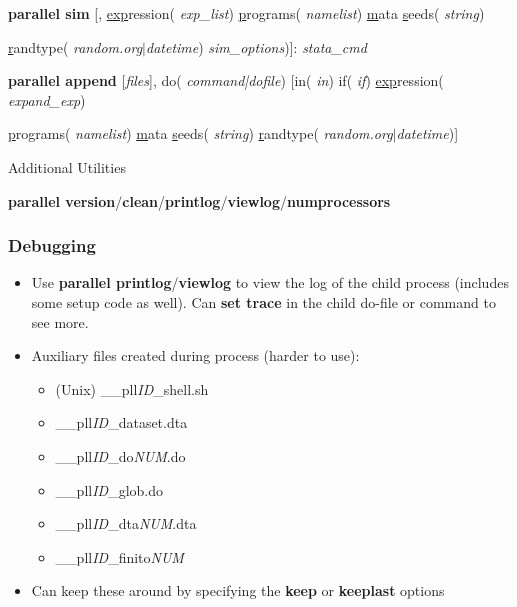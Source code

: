 \documentclass[9pt,\ExtraDocOpts]{beamer}
\begin{document}
\begin{frame}
\begin{semiverbatim}
	\footnotesize
	{\bf parallel sim} [, \uline{exp}ression(\textit{\color{blue} exp\_list}) \uline{p}rograms(\textit{\color{blue} namelist}) \uline{m}ata \uline{s}eeds(\textit{\color{blue} string})
	
	\hspace{1cm} \uline{r}andtype(\textit{\color{blue} random.org$|$datetime}) \textit{sim\_options})]:  \textit{stata\_cmd}
\end{semiverbatim}\pause{}

\begin{semiverbatim}
	\footnotesize
	{\bf parallel append} [\textit{files}], do(\textit{\color{blue} command|dofile}) [in(\textit{\color{blue} in}) if(\textit{\color{blue} if}) \uline{exp}ression(\textit{\color{blue} expand\_exp})
	
	\hspace{1cm} \uline{p}rograms(\textit{\color{blue} namelist}) \uline{m}ata \uline{s}eeds(\textit{\color{blue} string}) \uline{r}andtype(\textit{\color{blue} random.org$|$datetime})]
\end{semiverbatim}\pause{}

Additional Utilities
\begin{semiverbatim}
	\footnotesize
	{\bf parallel version}/{\bf clean}/{\bf printlog}/{\bf viewlog}/{\bf numprocessors}
\end{semiverbatim}

\end{frame}

\begin{frame}
\frametitle{Debugging }
\begin{itemize}
\item Use {\bf parallel printlog}/{\bf viewlog} to view the log of the child process (includes some setup code as well). Can {\bf set trace} in the child do-file or command to see more. \pause{}
\item Auxiliary files created during process (harder to use):\pause{}
\begin{itemize}
\item (Unix) \_\_pll\textit{ID}\_shell.sh
\item \_\_pll\textit{ID}\_dataset.dta
\item \_\_pll\textit{ID}\_do\textit{NUM}.do
\item \_\_pll\textit{ID}\_glob.do
\item \_\_pll\textit{ID}\_dta\textit{NUM}.dta
\item \_\_pll\textit{ID}\_finito\textit{NUM}\pause{}
\end{itemize}
\item Can keep these around by specifying the {\bf keep} or {\bf keeplast} options 
\end{itemize}
\end{frame}
\end{document}
